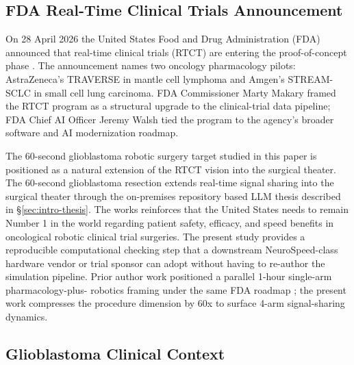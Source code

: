 
\subsection{FDA Real-Time Clinical Trials Announcement}
\label{sec:intro-fda}

On 28 April 2026 the United States Food and Drug Administration (FDA)
announced that real-time clinical trials (RTCT) are entering the
proof-of-concept phase \cite{fda2026realtime}. The announcement names
two oncology pharmacology pilots: AstraZeneca's TRAVERSE in mantle cell
lymphoma and Amgen's STREAM-SCLC in small cell lung carcinoma. FDA
Commissioner Marty Makary framed the RTCT program as a structural
upgrade to the clinical-trial data pipeline; FDA Chief AI Officer
Jeremy Walsh tied the program to the agency's broader software and AI
modernization roadmap.

The 60-second glioblastoma robotic surgery target studied in this
paper is positioned as a natural extension of the RTCT vision into
the surgical theater. The 60-second glioblastoma resection extends real-time signal sharing into the
surgical theater through the on-premises repository based LLM thesis
described in \S\ref{sec:intro-thesis}. The works reinforces that the United States needs to
remain Number 1 in the world regarding patient safety, efficacy, and
speed benefits in oncological robotic clinical trial surgeries.
The present study provides a reproducible computational checking step that
a downstream NeuroSpeed-class hardware vendor or trial sponsor can
adopt without having to re-author the simulation pipeline. Prior
author work positioned a parallel 1-hour single-arm pharmacology-plus-
robotics framing under the same FDA roadmap
\cite{kawchak_2026_19994945}; the present work compresses the
procedure dimension by 60x to surface 4-arm signal-sharing dynamics.

\subsection{Glioblastoma Clinical Context}
\label{sec:intro-gbm}


